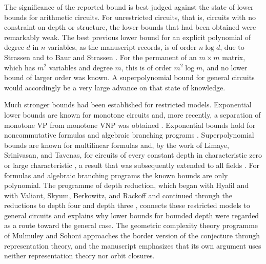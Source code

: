 \documentclass[11pt,letterpaper]{report}
\theoremstyle{plain}
\theoremstyle{definition}
\theoremstyle{remark}
\newcommand{\VP}{\mathrm{VP}}
\newcommand{\VNP}{\mathrm{VNP}}
\begin{document}
The significance of the reported bound is best judged against the state of lower bounds for arithmetic circuits. For unrestricted circuits, that is, circuits with no constraint on depth or structure, the lower bounds that had been obtained were remarkably weak. The best previous lower bound for an explicit polynomial of degree $d$ in $n$ variables, as the manuscript records, is of order $n\log d$, due to Strassen and to Baur and Strassen \cite{Strassen1973,BaurStrassen1983}. For the permanent of an $m\times m$ matrix, which has $m^2$ variables and degree $m$, this is of order $m^2\log m$, and no lower bound of larger order was known. A superpolynomial bound for general circuits would accordingly be a very large advance on that state of knowledge.

Much stronger bounds had been established for restricted models. Exponential lower bounds are known for monotone circuits \cite{JerrumSnir1982} and, more recently, a separation of monotone $\VP$ from monotone $\VNP$ was obtained \cite{Yehudayoff2019}. Exponential bounds hold for noncommutative formulas and algebraic branching programs \cite{Nisan1991}. Superpolynomial bounds are known for multilinear formulas \cite{Raz2009} and, by the work of Limaye, Srinivasan, and Tavenas, for circuits of every constant depth in characteristic zero or large characteristic \cite{LST2025}, a result that was subsequently extended to all fields \cite{Forbes2024}. For formulas and algebraic branching programs the known bounds are only polynomial. The programme of depth reduction, which began with Hyafil and with Valiant, Skyum, Berkowitz, and Rackoff \cite{Hyafil1979,VSBR1983} and continued through the reductions to depth four and depth three \cite{AgrawalVinay2008,Koiran2012,Tavenas2015,GKKS2016}, connects these restricted models to general circuits and explains why lower bounds for bounded depth were regarded as a route toward the general case. The geometric complexity theory programme of Mulmuley and Sohoni \cite{MulmuleySohoni2001,MulmuleySohoni2008} approaches the border version of the conjecture through representation theory, and the manuscript emphasizes that its own argument uses neither representation theory nor orbit closures.
\end{document}
